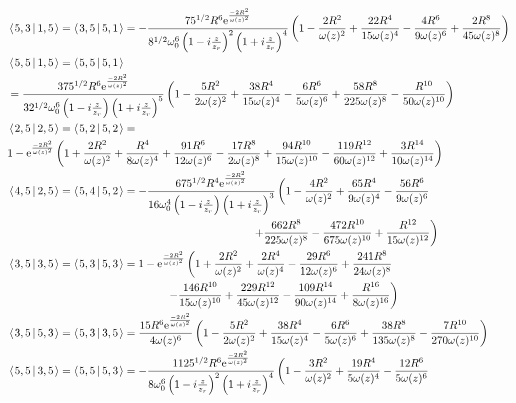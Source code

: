 \documentclass[11pt]{amsart}
\makeatletter
\newcommand{\e}{{\rm e}}				%
\newcommand{\msp}[1]{\mspace{#1mu}}		%
\newcommand{\0}{\varnothing}		%
\newcommand{\brac}[2]{\left\langle\msp{2} #1\left\lvert \msp{3.5} #2 \right.\right\rangle}	%
\newcommand{\1}{!}
\newcommand{\2}{@}
\newcommand{\3}{\#}
\newcommand{\4}{\$}
\newcommand{\5}{\%}
\newcommand{\6}{$^\wedge$}
\newcommand{\7}{\&}
\newcommand{\8}{*}
\newcommand{\9}{(}
\makeatother
\begin{document}
\begin{align*}
&
\brac{5,3}{1,5}=\brac{3,5}{5,1} = -\frac{75^{1/2}R^6\e^{\frac{-2R^2}{\omega(z)^2}}}{8^{1/2}\omega_0^6\left(1-i\frac{z}{z_r}\right)^2\left(1+i\frac{z}{z_r}\right)^4}\left(1-\frac{2R^2}{\omega(z)^2}+\frac{22R^4}{15\omega(z)^4}-\frac{4R^6}{9\omega(z)^6}+\frac{2R^8}{45\omega(z)^8}\right)
\\
&
\brac{5,5}{1,5} = \brac{5,5}{5,1}
\\
& =\frac{375^{1/2}R^6\e^{\frac{-2R^2}{\omega(z)^2}}}{32^{1/2}\omega_0^6\left(1-i\frac{z}{z_r}\right)\left(1+i\frac{z}{z_r}\right)^5}\left(1-\frac{5R^2}{2\omega(z)^2}+\frac{38R^4}{15\omega(z)^4}-\frac{6R^6}{5\omega(z)^6}+\frac{58R^8}{225\omega(z)^8}-\frac{R^{10}}{50\omega(z)^{10}}\right)
\\
&
\brac{2,5}{2,5} = \brac{5,2}{5,2} = 
\\
&
1-\e^{\frac{-2R^2}{\omega(z)^2}}\left(1+\frac{2R^2}{\omega(z)^2}+\frac{R^4}{8\omega(z)^4}+\frac{91R^6}{12\omega(z)^6}-\frac{17R^8}{2\omega(z)^8}+\frac{94R^{10}}{15\omega(z)^{10}}-\frac{119R^{12}}{60\omega(z)^{12}}+\frac{3R^{14}}{10\omega(z)^{14}}\right)
\\
&
\brac{4,5}{2,5} = \brac{5,4}{5,2} = -\frac{675^{1/2}R^4\e^{\frac{-2R^2}{\omega(z)^2}}}{16\omega_0^4\left(1-i\frac{z}{z_r}\right)\left(1+i\frac{z}{z_r}\right)^3}\left(1-\frac{4R^2}{\omega(z)^2}+\frac{65R^4}{9\omega(z)^4}-\frac{56R^6}{9\omega(z)^6}\right.
\\
&
\left.
\msp{400}+\frac{662R^8}{225\omega(z)^8}-\frac{472R^{10}}{675\omega(z)^{10}}+\frac{R^{12}}{15\omega(z)^{12}}\right)
\\
&
\brac{3,5}{3,5} =\brac{5,3}{5,3} =1-\e^{\frac{-2R^2}{\omega(z)^2}}\left(1+\frac{2R^2}{\omega(z)^2}+\frac{2R^4}{\omega(z)^4}-\frac{29R^6}{12\omega(z)^6}+\frac{241R^8}{24\omega(z)^8}\right.
\\
&
\msp{260}\left.-\frac{146R^{10}}{15\omega(z)^{10}}+\frac{229R^{12}}{45\omega(z)^{12}}-\frac{109R^{14}}{90\omega(z)^{14}}+\frac{R^{16}}{8\omega(z)^{16}}\right)
\\
&
\brac{3,5}{5,3} = \brac{5,3}{3,5} =\frac{15R^6\e^{\frac{-2R^2}{\omega(z)^2}}}{4\omega(z)^6}\left(1-\frac{5R^2}{2\omega(z)^2}+\frac{38R^4}{15\omega(z)^4}-\frac{6R^6}{5\omega(z)^6}+\frac{38R^8}{135\omega(z)^8}-\frac{7R^{10}}{270\omega(z)^{10}}\right)
\\
&
\brac{5,5}{3,5} = \brac{5,5}{5,3} = -\frac{1125^{1/2}R^6\e^{\frac{-2R^2}{\omega(z)^2}}}{8\omega_0^6\left(1-i\frac{z}{z_r}\right)^2\left(1+i\frac{z}{z_r}\right)^4}\left(1-\frac{3R^2}{\omega(z)^2}+\frac{19R^4}{5\omega(z)^4}-\frac{12R^6}{5\omega(z)^6}\right.

\end{align*}
\end{document}
